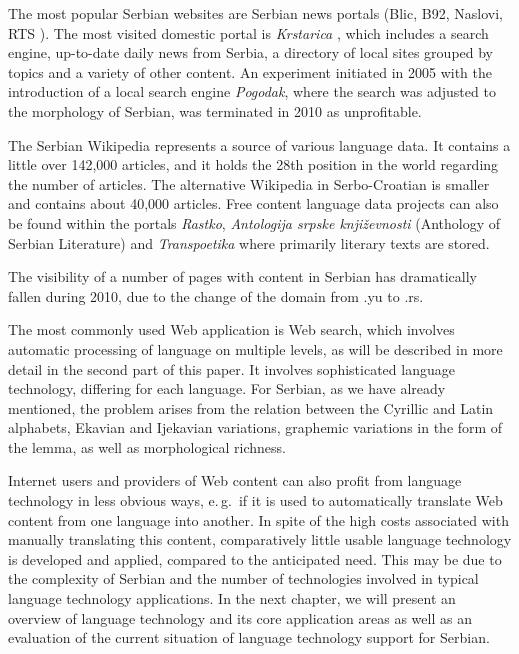 \begin{multicols}{2}
The most popular Serbian websites are Serbian news portals (Blic, \cite{BLIC} B92, \cite{B92} Naslovi, \cite{NASLOVI} RTS \cite{RTS}). The most visited domestic portal is \textit{Krstarica} \cite{KRSTARICA}, which includes a search engine, up-to-date daily news from Serbia, a directory of local sites grouped by topics and a variety of other content. An experiment initiated in 2005 with the introduction of a local search engine \textit{Pogodak}, where the search was adjusted to the morphology of Serbian, was terminated in 2010 as unprofitable.

The Serbian Wikipedia represents a source of various language data. It contains a little over 142,000 articles, and it holds the 28th position \cite{WIKI} in the world regarding the number of articles. The alternative Wikipedia in Serbo-Croatian \cite{SHWIKI} is smaller and contains about 40,000 articles. Free content language data projects can also be found within the portals \textit{Rastko}, \cite{RASTKO} \textit{Antologija srpske književnosti} \cite{ASK} (Anthology of Serbian Literature) and \textit{Transpoetika} \cite{TRPOET} where primarily literary texts are stored. 

The visibility of a number of pages with content in Serbian has dramatically fallen during 2010, due to the change of the domain from .yu to .rs. 

The most commonly used Web application is Web search, which involves automatic processing of language on multiple levels, as will be described in more detail in the second part of this paper. It involves sophisticated language technology, differing for each language. For Serbian, as we have already mentioned, the problem arises from the relation between the Cyrillic and Latin alphabets, Ekavian and Ijekavian variations, graphemic variations in the form of the lemma, as well as morphological richness. 

Internet users and providers of Web content can also profit from language technology in less obvious ways, e.\,g.~if it is used to automatically translate Web content from one language into another. In spite of the high costs associated with manually translating this content, comparatively little usable language technology is developed and applied, compared to the anticipated need. This may be due to the complexity of Serbian and the number of technologies involved in typical language technology applications. In the next chapter, we will present an overview of language technology and its core application areas as well as an evaluation of the current situation of language technology support for Serbian.  
\end{multicols}

